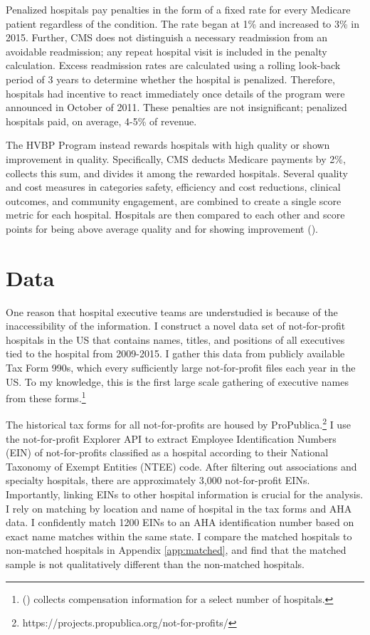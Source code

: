 \documentclass[12pt]{article}
\begin{document}
    Penalized hospitals pay penalties in the form of a fixed rate for every Medicare patient regardless of the condition. The rate began at 1\% and increased to 3\% in 2015. Further, CMS does not distinguish a necessary readmission from an avoidable readmission; any repeat hospital visit is included in the penalty calculation. Excess readmission rates are calculated using a rolling look-back period of 3 years to determine whether the hospital is penalized. Therefore, hospitals had incentive to react immediately once details of the program were announced in October of 2011. These penalties are not insignificant; penalized hospitals paid, on average, 4-5\% of revenue. 

    The HVBP Program instead rewards hospitals with high quality or shown improvement in quality. Specifically, CMS deducts Medicare payments by 2\%, collects this sum, and divides it among the rewarded hospitals. Several quality and cost measures in categories safety, efficiency and cost reductions, clinical outcomes, and community engagement, are combined to create a single score metric for each hospital. Hospitals are then compared to each other and score points for being above average quality and for showing improvement (\cite{CMS_2023}). 

    

	\section{Data}\label{sec:data}

    One reason that hospital executive teams are understudied is because of the inaccessibility of the information. I construct a novel data set of not-for-profit hospitals in the US that contains names, titles, and positions of all executives tied to the hospital from 2009-2015. I gather this data from publicly available Tax Form 990s, which every sufficiently large not-for-profit files each year in the US. To my knowledge, this is the first large scale gathering of executive names from these forms.\footnote{\citeauthor{brickley2010board} (\citeyear{brickley2010board}) collects compensation information for a select number of hospitals.} 

    The historical tax forms for all not-for-profits are housed by ProPublica.\footnote{https://projects.propublica.org/not-for-profits/} I use the not-for-profit Explorer API to extract Employee Identification Numbers (EIN) of not-for-profits classified as a hospital according to their National Taxonomy of Exempt Entities (NTEE) code. After filtering out associations and specialty hospitals, there are approximately 3,000 not-for-profit EINs. Importantly, linking EINs to other hospital information is crucial for the analysis. I rely on matching by location and name of hospital in the tax forms and AHA data. I confidently match 1200 EINs to an AHA identification number based on exact name matches within the same state. I compare the matched hospitals to non-matched hospitals in Appendix \ref{app:matched}, and find that the matched sample is not qualitatively different than the non-matched hospitals.
    
\end{document}
